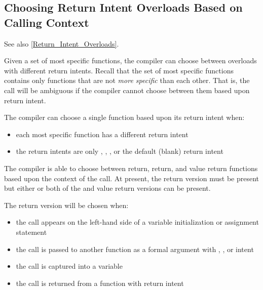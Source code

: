 \subsection{Choosing Return Intent Overloads Based on Calling Context}
\label{Choosing_Return_Intent_Overload}

See also \ref{Return_Intent_Overloads}.

Given a set of most specific functions, the compiler can choose between
overloads with different return intents. Recall that the set of most
specific functions contains only functions that are not \emph{more specific}
than each other. That is, the call will be ambiguous if the compiler
cannot choose between them based upon return intent.

The compiler can choose a single function based upon its return intent
when:

\begin{itemize}

\item each most specific function has a different return intent

\item the return intents are only , ,
, or the default (blank) return intent

\end{itemize}

The compiler is able to choose between  return,  return, and value return functions based upon the context of the
call. At present, the  return version must be present but
either or both of the  and value return versions can be
present.

The  return version will be chosen when:

\begin{itemize}

\item the call appears on the left-hand side of a variable initialization
or assignment statement

\item the call is passed to another function as a formal argument with
, , or  intent

\item the call is captured into a  variable

\item the call is returned from a function with  return intent

\end{itemize}

